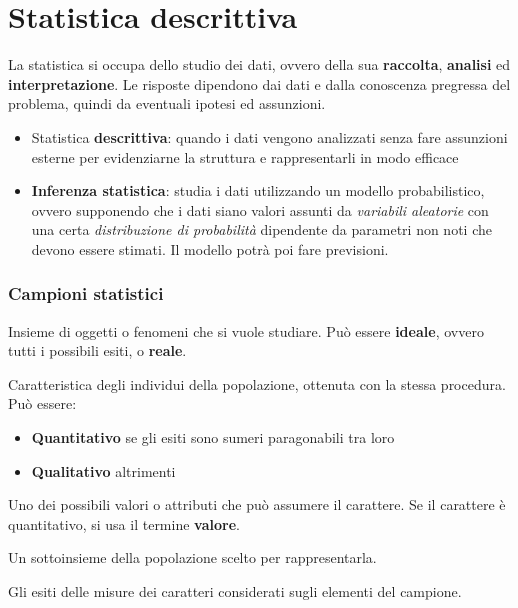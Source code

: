 \section{Statistica descrittiva}
La statistica si occupa dello studio dei dati, ovvero della sua \textbf{raccolta}, \textbf{analisi} ed \textbf{interpretazione}. Le risposte dipendono dai dati e dalla conoscenza pregressa del problema, quindi da eventuali ipotesi ed assunzioni.\\
\begin{itemize}
	\item Statistica \textbf{descrittiva}: quando i dati vengono analizzati senza fare assunzioni esterne per evidenziarne la struttura e rappresentarli in modo efficace
	\item \textbf{Inferenza statistica}: studia i dati utilizzando un modello probabilistico, ovvero supponendo che i dati siano valori assunti da \textit{variabili aleatorie} con una certa \textit{distribuzione di probabilità} dipendente da parametri non noti che devono essere stimati. Il modello potrà poi fare previsioni.
\end{itemize}

\subsubsection{Campioni statistici}
\begin{definition}
	Insieme di oggetti o fenomeni che si vuole studiare. Può essere \textbf{ideale}, ovvero tutti i possibili esiti, o \textbf{reale}.
\end{definition}
\begin{definition}[Carattere]
	Caratteristica degli individui della popolazione, ottenuta con la stessa procedura. Può essere:
	\begin{itemize}
		\item \textbf{Quantitativo} se gli esiti sono sumeri paragonabili tra loro
		\item \textbf{Qualitativo} altrimenti
	\end{itemize}
\end{definition}
\begin{definition}[Modalità]
	Uno dei possibili valori o attributi che può assumere il carattere. Se il carattere è quantitativo, si usa il termine \textbf{valore}.
\end{definition}
\begin{definition}
	Un sottoinsieme della popolazione scelto per rappresentarla.
\end{definition}
\begin{definition}[Dati]
	Gli esiti delle misure dei caratteri considerati sugli elementi del campione.
\end{definition}

